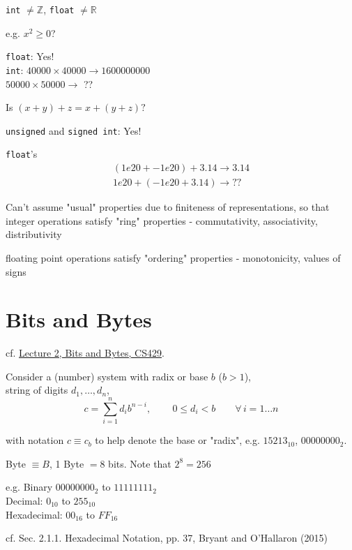 \documentclass[10pt]{amsart}
\begin{document}
\begin{multicols*}{2}
\texttt{int} $\neq \mathbb{Z}$, \texttt{float} $\neq \mathbb{R}$

e.g. $x^2 \geq 0$? 

\texttt{float}: Yes!  \\
\texttt{int}: $40000 \times 40000 \to 1600000000$ \\
\phantom{int} $50000 \times 50000 \to $ ??

Is $(x+y) + z = x + (y +z)?$

\texttt{unsigned} and \texttt{signed int}: Yes!

\texttt{float}'s 
\[
\begin{gathered}
(1e20 + -1e20) + 3.14 \to 3.14 \\
1e20 + (-1e20 + 3.14) \to ??
\end{gathered}
\]

Can't assume "usual" properties due to finiteness of representations, so that integer operations satisfy "ring" properties
- commutativity, associativity, distributivity

floating point operations satisfy "ordering" properties
- monotonicity, values of signs


\section{Bits and Bytes}

cf. \href{https://www.cs.utexas.edu/users/fussell/courses/cs429h/lectures/Lecture_2-429h.pdf}{Lecture 2, Bits and Bytes, CS429}.

Consider a (number) system with radix or base $b$ ($b>1$), \\
string of digits $d_1, \dots , d_n$, \\
\begin{equation}
c = \sum_{i=1}^n d_i b^{n-i}, \qquad \, 0 \leq d_i < b \qquad \forall \, i = 1 \dots n 
\end{equation}

with notation $c \equiv c_b$ to help denote the base or "radix", e.g. $15213_{10}$, $00000000_2$.

Byte $\equiv B$, 1 Byte $ = 8$ bits. Note that $2^8 = 256$

e.g. Binary $00000000_2$ to $11111111_2$ \\
Decimal: $0_{10}$ to $255_{10}$ \\
Hexadecimal: $00_{16}$ to $FF_{16}$

cf. Sec. 2.1.1. Hexadecimal Notation, pp. 37, Bryant and O'Hallaron (2015) \cite{BrOH2016}


\end{multicols*}
\end{document}
